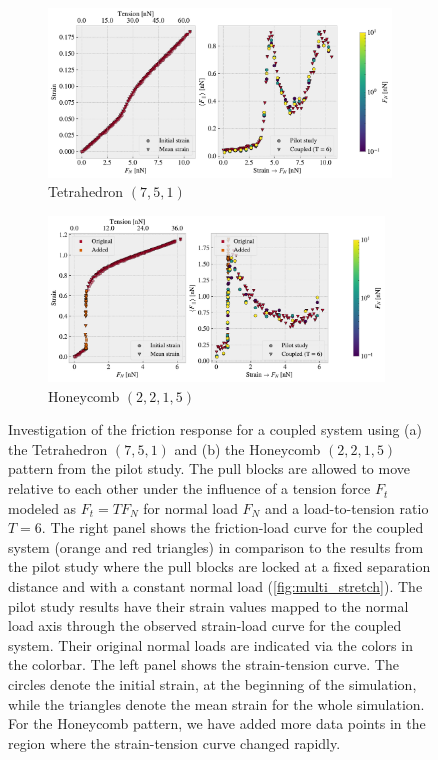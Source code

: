 \begin{figure}[!htb]
  \centering
  \begin{subfigure}[t]{\textwidth}
      \centering
      \includegraphics[width=\textwidth]{figures/negative_coefficient/manual_coupling_tension_pop7_5_1.pdf}
      \caption{Tetrahedron $(7,5,1)$}
  \end{subfigure}
  \begin{subfigure}[t]{\textwidth}
    \centering
    \raggedleft
    \includegraphics[width=0.98\textwidth]{figures/negative_coefficient/manual_coupling_tension_hon2215.pdf}
    \caption{Honeycomb $(2,2,1,5)$}
  \end{subfigure}
  \hfill
  \caption{Investigation of the friction response for a coupled system using (a)
  the Tetrahedron $(7,5,1)$ and (b) the Honeycomb $(2,2,1,5)$ pattern from the
  pilot study. The pull blocks are allowed to move relative to each other under
  the influence of a tension force $F_t$ modeled as $F_t = TF_N$ for normal load
  $F_N$ and a load-to-tension ratio $T=6$. The right panel shows the
  friction-load curve for the coupled system (orange and red triangles) in
  comparison to the results from the pilot study where the pull blocks are
  locked at a fixed separation distance and with a constant normal load
  (\cref{fig:multi_stretch}). The pilot study results have their strain values
  mapped to the normal load axis through the observed strain-load curve for the
  coupled system. Their original normal loads are indicated via the colors in
  the colorbar. The left panel shows the strain-tension curve. The circles
  denote the initial strain, at the beginning of the simulation, while the
  triangles denote the mean strain for the whole simulation. For the Honeycomb
  pattern, we have added more data points in the region where the strain-tension
  curve changed rapidly.}
  \label{fig:negfric}
\end{figure}

